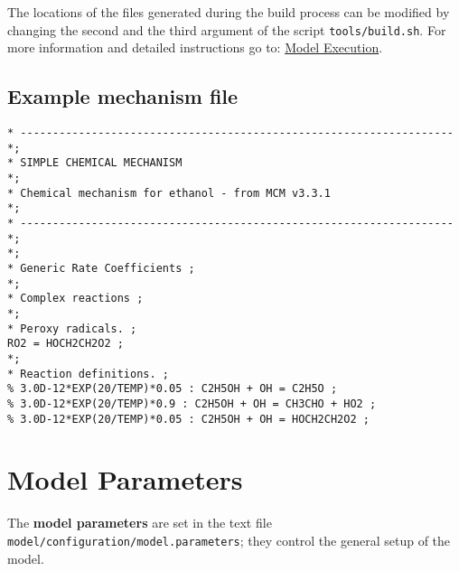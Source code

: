 The locations of the files generated during the build process can be
modified by changing the second and the third argument of the script
\texttt{tools/build.sh}. For more information and detailed
instructions go to: \hyperref[ch:execution]{Model Execution}.

\subsection{Example mechanism file} \label{subsec:example-mechanism-file}

\begin{verbatim}
* ------------------------------------------------------------------- *;
* SIMPLE CHEMICAL MECHANISM                                           *;
* Chemical mechanism for ethanol - from MCM v3.3.1                    *;
* ------------------------------------------------------------------- *;
*;
* Generic Rate Coefficients ;
*;
* Complex reactions ;
*;
* Peroxy radicals. ;
RO2 = HOCH2CH2O2 ;
*;
* Reaction definitions. ;
% 3.0D-12*EXP(20/TEMP)*0.05 : C2H5OH + OH = C2H5O ;
% 3.0D-12*EXP(20/TEMP)*0.9 : C2H5OH + OH = CH3CHO + HO2 ;
% 3.0D-12*EXP(20/TEMP)*0.05 : C2H5OH + OH = HOCH2CH2O2 ;
\end{verbatim}

\section{Model Parameters} \label{sec:parameters}

The \textbf{model parameters} are set in the text file
\texttt{model/configuration/model.parameters}; they control the
general setup of the model.


